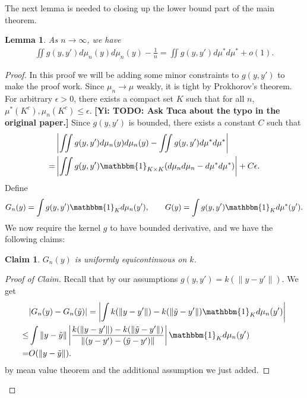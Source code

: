 \documentclass[10pt]{article}
\newcommand{\norm}[1]{\left\lVert#1\right\rVert}
\newcommand{\gy}[1]{\textbf{\color{gred}[Yi: #1]}}
\newtheorem{lemma}{\bf Lemma}
\newtheorem{claim}{\bf Claim}
\newenvironment{Proof of lemma}{\noindent{\bf Proof of Lemma}}{\hfill$\Box$\newline}
\newenvironment{Proof of claim}{\noindent{\bf Proof of claim}}{\hfill$\Box$\newline}
\newenvironment{Proof of theorem}{\noindent{\bf Proof of Theorem}}{\hfill\scriptsize{$\Box$}\newline}
\newenvironment{Proof of theorems}{\noindent{\bf Proof of Theorems}}{\hfill$\Box$\newline}
\newenvironment{Proof of proposition}{\noindent{\bf Proof of Proposition}}{\hfill$\Box$\newline}
\newenvironment{Proof of propositions}{\noindent{\bf Proof of Propositions}}{\hfill$\Box$\newline}
\newenvironment{Proof of exercise}{\noindent{\it Proof of Exercise:}}{\hfill$\Box$}
\numberwithin{equation}{section}
\begin{document}
The next lemma is needed to closing up the lower bound part of the main theorem.
\begin{lemma} \label{output_kernel_int_lemma}
    As $n \to \infty$, we have
    \begin{align}
        \iint g(y,y')d\mu_n(y) d\mu_n(y) - \frac{1}{n} = \iint g(y,y')d\mu^* d\mu^* + o(1).
    \end{align}
\end{lemma}
\begin{proof}
    In this proof we will be adding some minor constraints to $g(y,y')$ to make the proof work. Since $\mu_n \to \mu$ weakly, it is tight by Prokhorov's theorem. For arbitrary $\epsilon >0$, there exists a compact set $K$ such that for all $n$, $\mu^*(K^c),\mu_n(K^c) \leq \epsilon$. \gy{TODO: Ask Tuca about the typo in the original paper.} Since $g(y,y')$ is bounded, there exists a constant $C$ such that
    \begin{align}
          & \left|\iint g(y,y')d\mu_n(y) d\mu_n(y) - \iint g(y,y')d\mu^* d\mu^*\right| \nonumber            \\
        = & \left|\iint g(y,y') \mathbbm{1}_{K \times K}(d\mu_n d\mu_n - d\mu^* d\mu^*)\right| + C\epsilon.
    \end{align}
    Define
    \begin{align}
        G_n(y) = \int g(y,y') \mathbbm{1}_K d\mu_n(y'), \qquad G(y) = \int g(y,y') \mathbbm{1}_K d\mu^*(y').
    \end{align}
    We now require the kernel $g$ to have bounded derivative, and we have the following claims:
    \begin{claim} \label{claim_1}
        $G_n(y)$ is uniformly equicontinuous on $k$.
    \end{claim}
    \begin{proof}[Proof of Claim]
        Recall that by our assumptions $g(y,y') = k(\norm{y-y'})$. We get
        \begin{align}
                 & |G_n(y)-G_n(\tilde{y})| = \left|\int k(\norm{y-y'}) - k(\norm{\tilde{y}-y'}) \mathbbm{1}_K d\mu_n(y')\right| \nonumber                              \\
            \leq & \int \norm{y-\tilde{y}}\left|\frac{k(\norm{y-y'}) - k(\norm{\tilde{y}-y'})}{\norm{(y-y')-(\tilde{y}-y')}} \right|\mathbbm{1}_K d\mu_n(y') \nonumber \\
            =    & O(\norm{y-\tilde{y}}).
        \end{align}
        by mean value theorem and the additional assumption we just added.

\end{proof}
\end{proof}
\end{document}
